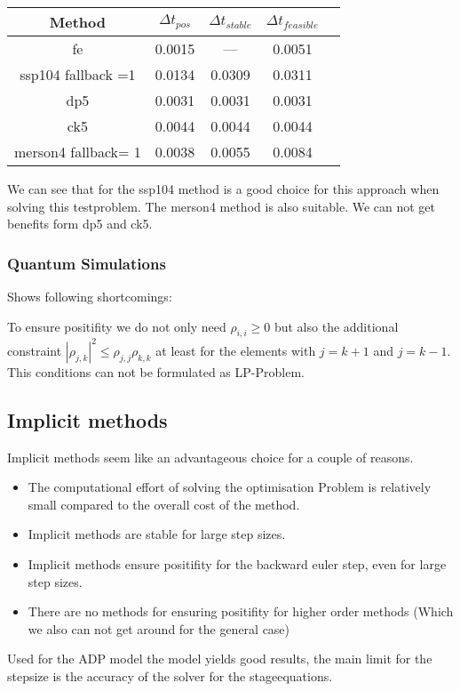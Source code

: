 \documentclass{article}
\begin{document}
\begin{tabular}{|c|c|c|c|c|}
\hline 
Method & $\Delta t_{pos}$ &$\Delta t_{stable}$& $\Delta t_{feasible}$  \\ 
\hline
fe & 0.0015 & --- &  0.0051 \\
\hline 
ssp104 fallback =1 & 0.0134 & 0.0309 & 0.0311 \\ 
\hline 
dp5 &0.0031 &0.0031 & 0.0031\\ 
\hline 
ck5 & 0.0044&  0.0044 & 0.0044\\ 
\hline 
merson4 fallback= 1& 0.0038& 0.0055 & 0.0084\\
\hline
\end{tabular} 

We can see that for the ssp104 method is a good choice for this approach when solving this testproblem.  The merson4 method is also suitable. We can not get benefits form dp5 and ck5.


\subsubsection{Quantum Simulations}
Shows following shortcomings:

To ensure positifity we do not only need $\rho_{i,i} \geq 0$ but also the additional constraint $|\rho_{j,k}|^2 \leq \rho_{j,j} \rho_{k,k}$ at least for the elements with $j = k +1$ and $j = k-1$. This conditions can not be formulated as LP-Problem.

\subsection{Implicit methods}
Implicit methods seem like an advantageous choice for a couple of reasons.

\begin{itemize}
\item The computational effort of solving the optimisation Problem is relatively small compared to the overall cost of the method.
\item Implicit methods are stable for large step sizes.
\item Implicit methods ensure positifity for the backward euler step, even for large step sizes.
\item There are no methods for ensuring positifity for higher order methods (Which we also can not get around for the general case)
\end{itemize}

Used for the ADP model the model yields good results, the main limit for the stepsize is the accuracy of the solver for the stageequations.
\end{document}
